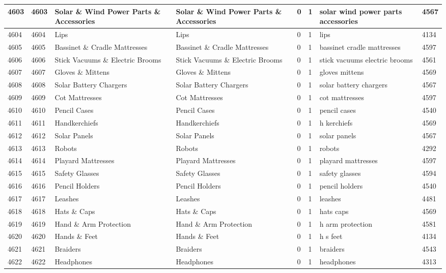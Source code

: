 \begin{longtable}{|l|l|l|l|l|l|l|l|}
4603 & 4603 & Solar \& Wind Power Parts \& Accessories & Solar \& Wind Power Parts \& Accessories & 0 & 1 & solar wind power parts accessories & 4567 \\ \hline 
4604 & 4604 & Lips & Lips & 0 & 1 & lips & 4134 \\ \hline 
4605 & 4605 & Bassinet \& Cradle Mattresses & Bassinet \& Cradle Mattresses & 0 & 1 & bassinet cradle mattresses & 4597 \\ \hline 
4606 & 4606 & Stick Vacuums \& Electric Brooms & Stick Vacuums \& Electric Brooms & 0 & 1 & stick vacuums electric brooms & 4561 \\ \hline 
4607 & 4607 & Gloves  \& Mittens & Gloves  \& Mittens & 0 & 1 & gloves mittens & 4569 \\ \hline 
4608 & 4608 & Solar Battery Chargers & Solar Battery Chargers & 0 & 1 & solar battery chargers & 4567 \\ \hline 
4609 & 4609 & Cot Mattresses & Cot Mattresses & 0 & 1 & cot mattresses & 4597 \\ \hline 
4610 & 4610 & Pencil Cases & Pencil Cases & 0 & 1 & pencil cases & 4540 \\ \hline 
4611 & 4611 & Handkerchiefs & Handkerchiefs & 0 & 1 & h kerchiefs & 4569 \\ \hline 
4612 & 4612 & Solar Panels & Solar Panels & 0 & 1 & solar panels & 4567 \\ \hline 
4613 & 4613 & Robots & Robots & 0 & 1 & robots & 4292 \\ \hline 
4614 & 4614 & Playard Mattresses & Playard Mattresses & 0 & 1 & playard mattresses & 4597 \\ \hline 
4615 & 4615 & Safety Glasses & Safety Glasses & 0 & 1 & safety glasses & 4594 \\ \hline 
4616 & 4616 & Pencil Holders & Pencil Holders & 0 & 1 & pencil holders & 4540 \\ \hline 
4617 & 4617 & Leashes & Leashes & 0 & 1 & leashes & 4481 \\ \hline 
4618 & 4618 & Hats \& Caps & Hats \& Caps & 0 & 1 & hats caps & 4569 \\ \hline 
4619 & 4619 & Hand \& Arm Protection & Hand \& Arm Protection & 0 & 1 & h arm protection & 4581 \\ \hline 
4620 & 4620 & Hands \& Feet & Hands \& Feet & 0 & 1 & h s feet & 4134 \\ \hline 
4621 & 4621 & Braiders & Braiders & 0 & 1 & braiders & 4543 \\ \hline 
4622 & 4622 & Headphones & Headphones & 0 & 1 & headphones & 4313 \\ \hline 

\end{longtable}
